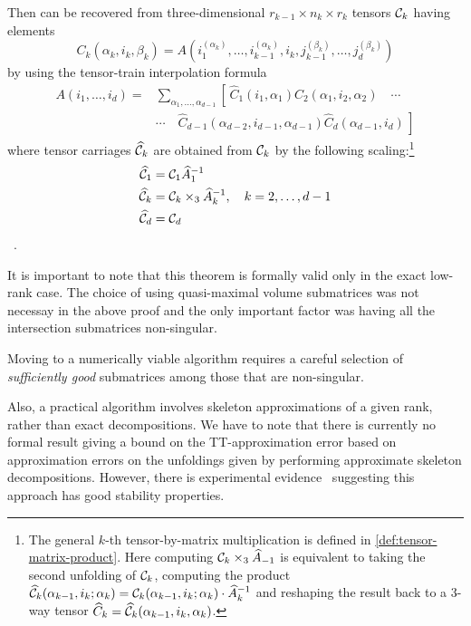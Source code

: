 \begin{Teo}
  Then \A can be recovered from three-dimensional $r_{k-1} \times n_k \times r_k$ tensors $\mathcal{C}_k$ having elements
  \begin{equation*}
    C_k(\alpha_k,i_k,\beta_k) = A(i_1^{(\alpha_k)},\ldots,i_{k-1}^{(\alpha_k)},i_k,j_{k-1}^{(\beta_k)},\ldots,j_d^{(\beta_k)})
  \end{equation*}
  by using the tensor-train interpolation formula
  \begin{align*}
    A(i_1,\ldots,i_d) =& \sum_{\alpha_1,\ldots,\alpha_{d-1}} \left[ \, \hat{C}_1(i_1,\alpha_1) \hat{C}_2(\alpha_1,i_2,\alpha_2) \quad \cdots \right. \nonumber \\
    &\cdots \quad \left. \hat{C}_{d-1}(\alpha_{d-2},i_{d-1},\alpha_{d-1}) \hat{C}_d(\alpha_{d-1},i_d) \, \right]
  \end{align*}
  where tensor carriages $\widehat{\mathcal{C}}_k$ are obtained from $\mathcal{C}_k$ by the following scaling:\footnote{The general $k$-th tensor-by-matrix multiplication is defined in \ref{def:tensor-matrix-product}. Here computing $\mathcal{C}_k \times_3 \widehat{A}_{-1}$ is equivalent to taking the second unfolding of $\mathcal{C}_k$, computing the product $\widehat{\mathcal{C}}_k(\alpha_{k-1},i_k;\alpha_k) = \mathcal{C}_k(\alpha_{k-1},i_k;\alpha_k) \cdot \widehat{A}_k^{-1}$ and reshaping the result back to a 3-way tensor $\widehat{C}_k = \widehat{\mathcal{C}}_k(\alpha_{k-1},i_k,\alpha_k)$.}
  \begin{align*}
    \widehat{\mathcal{C}}_1 &= \mathcal{C}_1 \widehat{A}_1^{-1} \nonumber \\
    \widehat{\mathcal{C}}_k &= \mathcal{C}_k \times_3 \widehat{A}_k^{-1}, \quad k = 2, \ldots, d-1 \\
    \widehat{\mathcal{C}}_d &= \mathcal{C}_d \nonumber
  \end{align*}\, .
\end{Teo}

It is important to note that this theorem is formally valid only in the exact low-rank case. The choice of using quasi-maximal volume submatrices was not necessay in the above proof and the only important factor was having all the intersection submatrices non-singular.

Moving to a numerically viable algorithm requires a careful selection of \emph{sufficiently good} submatrices among those that are non-singular.

Also, a practical algorithm involves skeleton approximations of a given rank, rather than exact decompositions. We have to note that there is currently no formal result giving a bound on the TT-approximation error based on approximation errors on the unfoldings given by performing approximate skeleton decompositions. However, there is experimental evidence~\cite{tt-cross} suggesting this approach has good stability properties.

